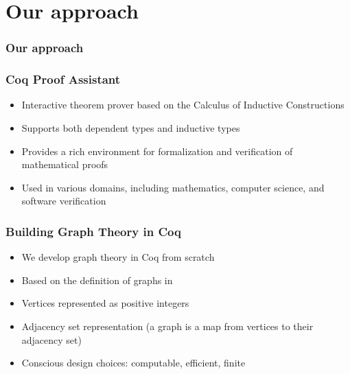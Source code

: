 \documentclass{beamer}
\begin{document}
\section{Our approach}
\begin{frame}
\frametitle{Our approach}
\begin{figure}
\centering
{}
\end {figure}
\end{frame}

\begin{frame}
\frametitle{Coq Proof Assistant}
\begin{itemize}
\item Interactive theorem prover based on the Calculus of Inductive Constructions
\item Supports both dependent types and inductive types
\item Provides a rich environment for formalization and verification of mathematical proofs
\item Used in various domains, including mathematics, computer science, and software verification
\end{itemize}
\end{frame}

\begin{frame}
\frametitle{Building Graph Theory in Coq}
\begin{itemize}
\item We develop graph theory in Coq from scratch
\item Based on the definition of graphs in \cite{sf}
\item Vertices represented as positive integers
\item Adjacency set representation (a graph is a map from vertices to
  their adjacency set)
\item Conscious design choices: computable, efficient, finite
\end{itemize}
\end{frame}
\end{document}

